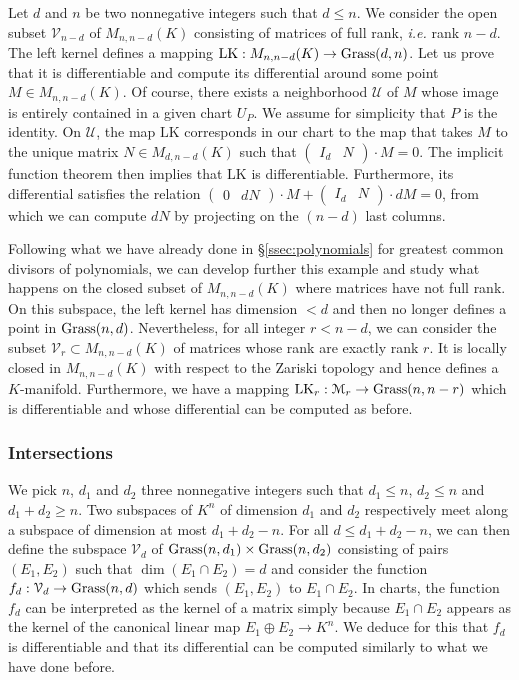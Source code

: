 \documentclass{lms}
\begin{document}
Let $d$ and $n$ be two nonnegative integers such that $d \leq n$.
We consider the open subset $\mathcal V_{n-d}$ of $M_{n,n-d}(K)$ 
consisting of matrices of full rank, \emph{i.e.} rank $n-d$. The left 
kernel defines a mapping $\text{LK} : M_{n,n-d}(K) \to \text{\rm Grass}(d,n)$. Let 
us prove that it is differentiable and compute its differential around 
some point $M \in M_{n,n-d}(K)$. Of course, there exists a neighborhood 
$\mathcal U$ of $M$ whose image is entirely contained in a given chart 
$U_P$. We assume for simplicity that $P$ is the identity. On $\mathcal 
U$, the map $\text{LK}$ corresponds in our chart to the map that 
takes $M$ to the unique matrix $N \in M_{d, n-d}(K)$ such that 
$\begin{pmatrix} I_d & N \end{pmatrix} \cdot M = 0$. The implicit 
function theorem then implies that $\text{LK}$ is differentiable. 
Furthermore, its differential satisfies the relation
$\begin{pmatrix} 0 & dN \end{pmatrix} \cdot M +
\begin{pmatrix} I_d & N \end{pmatrix} \cdot dM = 0$,
from which we can compute $dN$ by projecting on the $(n-d)$ last
columns.

Following what we have already done in \S \ref{ssec:polynomials} for 
greatest common divisors of polynomials, we can develop further this 
example and study what happens on the closed subset of $M_{n,n-d}(K)$ 
where matrices have not full rank. On this subspace, the left kernel has 
dimension $< d$ and then no longer defines a point in $\text{\rm Grass}(n,d)$. 
Nevertheless, for all integer $r < n-d$, we can consider the subset 
$\mathcal V_r \subset M_{n,n-d}(K)$ of matrices whose rank are exactly 
rank $r$. It is locally closed in $M_{n,n-d}(K)$ with respect to the 
Zariski topology and hence defines a $K$-manifold. Furthermore, we have a 
mapping $\text{LK}_r : \mathcal M_r \to \Grass(n,n-r)$ which is 
differentiable and whose differential can be computed as before.

\subsubsection*{Intersections}

We pick $n$, $d_1$ and 
$d_2$ three nonnegative integers such that $d_1 \leq n$, $d_2 \leq n$ 
and $d_1 + d_2 \geq n$. Two subspaces of $K^n$ of dimension $d_1$ and 
$d_2$ respectively meet along a subspace of dimension at most $d_1 + d_2 
- n$. For all $d \leq d_1 + d_2 -n$, we can then define the subspace 
$\mathcal V_d$ of $\text{\rm Grass}(n,d_1) \times \text{\rm Grass}(n,d_2)$ consisting of 
pairs $(E_1, E_2)$ such that $\dim (E_1 \cap E_2) = d$ and consider the 
function $f_d : \mathcal V_d \to \Grass(n, d)$ which sends $(E_1, E_2)$ 
to $E_1 \cap E_2$. In charts, the function $f_d$ can be interpreted as
the kernel of a matrix simply because $E_1 \cap E_2$ appears as the
kernel of the canonical linear map $E_1 \oplus E_2 \to K^n$. We deduce
for this that $f_d$ is differentiable and that its differential can be
computed similarly to what we have done before.
\end{document}
